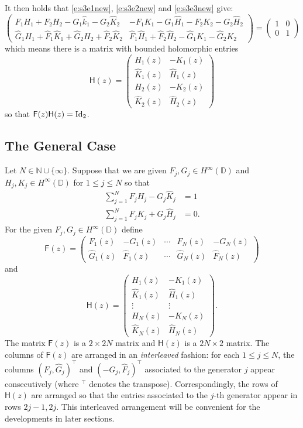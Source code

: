 \documentclass[11pt]{amsart}
\begin{document}
It then holds that \eqref{e:s3e1new}, \eqref{e:s3e2new} and \eqref{e:s3e3new} give:
$$
\left(
\begin{array}{cc}
  F_1H_1+F_2H_2-G_1\hat{k}_1-G_2\hat{K}_2
&   -F_1 K_1 - G_1 \hat H_1 - F_2 K_2 - G_2 \hat H_2 \\
\hat G_1 H_1 + \hat F_1 \hat K_1 + \hat G_2 H_2 + \hat F_2 \hat K_2 & \hat{F}_1\hat{H}_1+\hat{F}_2\hat{H}_2-\hat{G}_1K_1-\hat{G}_2 K_2
\end{array}
\right)=
\left(
\begin{array}{cc}
1 & 0\\
0 & 1
\end{array}\right)
$$
which means there is a matrix with bounded holomorphic entries
$$
\mathsf{H}(z)=
\left(
\begin{array}{cc}
H_1(z) & -K_1(z) \\
\hat K_1(z) & \hat H_1(z) \\
H_2(z) & -K_2(z) \\
\hat K_2(z) & \hat H_2(z)
\end{array}
\right)
$$
so that $\mathsf{F}(z)\mathsf{H}(z)=\textnormal{Id}_2$.

\subsection{The General Case}

Let $N\in \mathbb{N}\cup\{\infty\}$.  Suppose that we are given $F_j,G_j\in H^\infty(\mathbb{D})$ and $H_j, K_j\in H^\infty(\mathbb{D})$ for $1\leq j\leq N$ so that
\begin{align}
    \sum_{j=1}^{N}F_jH_j-G_j\hat{K}_j &=1\label{e:e1n}\\
    \sum_{j=1}^{N} F_jK_j+G_j\hat{H}_j &= 0\label{e:e2n}.
\end{align}
For the given $F_j,G_j\in H^\infty(\mathbb{D})$ define
$$
\mathsf{F}(z)=
\left(
\begin{array}{cccccc}
F_1(z) & -G_1(z) & \cdots & F_N(z) & -G_N(z) \\
\hat G_1(z) & \hat F_1(z) & \cdots & \hat G_N(z) & \hat F_N(z)
\end{array}
\right)
$$
and
$$
\mathsf{H}(z)=
\left(
\begin{array}{cc}
H_1(z) & -K_1(z) \\
\hat K_1(z) & \hat H_1(z) \\
\vdots & \vdots \\
H_N(z) & -K_N(z) \\
\hat K_N(z) & \hat H_N(z)
\end{array}
\right).
$$
The matrix $\mathsf{F}(z)$ is a $2\times 2N$ matrix and $\mathsf{H}(z)$ is a $2N\times 2$ matrix.  The columns of $\mathsf{F}(z)$ are arranged in an \emph{interleaved} fashion: for each $1\leq j\leq N$, the columns $(F_j,\hat G_j)^\top$ and $(-G_j,\hat F_j)^\top$ associated to the generator $j$ appear consecutively (where $^\top$ denotes the transpose).  Correspondingly, the rows of $\mathsf{H}(z)$ are arranged so that the entries associated to the $j$-th generator appear in rows $2j-1, 2j$.  This interleaved arrangement will be convenient for the developments in later sections.
\end{document}
